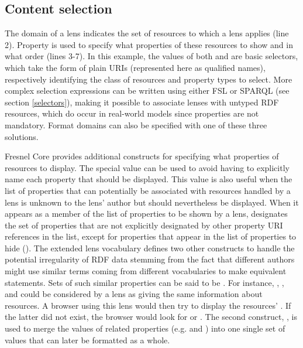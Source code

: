 \vspace{-1.5cm}

\subsection{Content selection}

The domain of a lens indicates the set of resources to which a lens applies (line 2). Property  is used to specify what properties of these resources to show and in what order (lines 3-7). In this example, the values of both  and  are basic selectors, which take the form of plain URIs (represented here as qualified names), respectively identifying the class of resources and property types to select. More complex selection expressions can be written using either FSL or SPARQL (see section \ref{selectors}), making it possible to associate lenses with untyped RDF resources, which do occur in real-world models since  properties are not mandatory. Format domains can also be specified with one of these three solutions.

Fresnel Core provides additional constructs for specifying what properties of resources to display. The special value  can be used to avoid having to explicitly name each property that should be displayed. This value is also useful when the list of properties that can potentially be associated with resources handled by a lens is unknown to the lens' author but should nevertheless be displayed. When it appears as a member of the list of properties to be shown by a lens,  designates the set of properties that are not explicitly designated by other property URI references in the list, except for properties that appear in the list of properties to hide (). The extended lens vocabulary defines two other constructs to handle the potential irregularity of RDF data stemming from the fact that different authors might use similar terms coming from different vocabularies to make equivalent statements. Sets of such similar properties can be said to be . For instance, , , and  could be considered by a lens as giving the same information about resources. A browser using this lens would then try to display the resources' . If the latter did not exist, the browser would look for  or . The second construct, , is used to merge the values of related properties (e.g.  and ) into one single set of values that can later be formatted as a whole.

